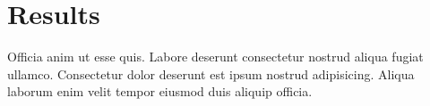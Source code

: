 
\chapter{Results}\label{ch:results}

Officia anim ut esse quis. Labore deserunt consectetur nostrud aliqua fugiat ullamco. Consectetur dolor deserunt est ipsum nostrud adipisicing. Aliqua laborum enim velit tempor eiusmod duis aliquip officia.

